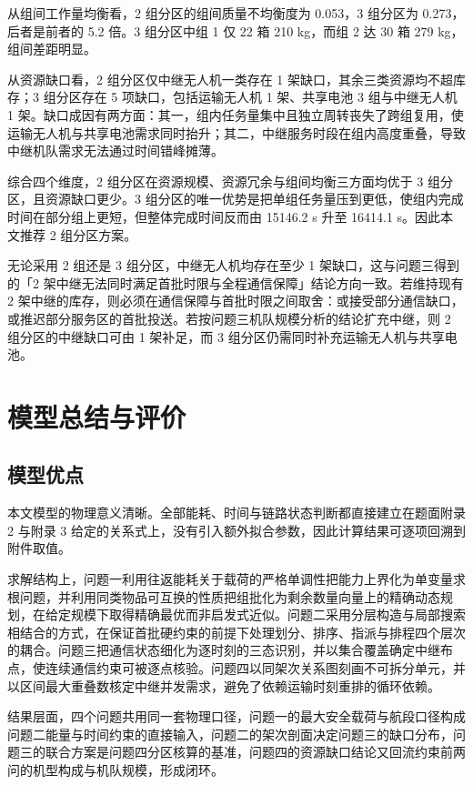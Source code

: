 \documentclass[bwprint]{gmcmthesis}
\begin{document}
从组间工作量均衡看，2 组分区的组间质量不均衡度为 0.053，3 组分区为 0.273，后者是前者的 5.2 倍。3 组分区中组 1 仅 22 箱 210 kg，而组 2 达 30 箱 279 kg，组间差距明显。

从资源缺口看，2 组分区仅中继无人机一类存在 1 架缺口，其余三类资源均不超库存；3 组分区存在 5 项缺口，包括运输无人机 1 架、共享电池 3 组与中继无人机 1 架。缺口成因有两方面：其一，组内任务量集中且独立周转丧失了跨组复用，使运输无人机与共享电池需求同时抬升；其二，中继服务时段在组内高度重叠，导致中继机队需求无法通过时间错峰摊薄。

综合四个维度，2 组分区在资源规模、资源冗余与组间均衡三方面均优于 3 组分区，且资源缺口更少。3 组分区的唯一优势是把单组任务量压到更低，使组内完成时间在部分组上更短，但整体完成时间反而由 15146.2 s 升至 16414.1 s。因此本文推荐 2 组分区方案。

无论采用 2 组还是 3 组分区，中继无人机均存在至少 1 架缺口，这与问题三得到的「2 架中继无法同时满足首批时限与全程通信保障」结论方向一致。若维持现有 2 架中继的库存，则必须在通信保障与首批时限之间取舍：或接受部分通信缺口，或推迟部分服务区的首批投送。若按问题三机队规模分析的结论扩充中继，则 2 组分区的中继缺口可由 1 架补足，而 3 组分区仍需同时补充运输无人机与共享电池。

\section{模型总结与评价}

\subsection{模型优点}
本文模型的物理意义清晰。全部能耗、时间与链路状态判断都直接建立在题面附录 2 与附录 3 给定的关系式上，没有引入额外拟合参数，因此计算结果可逐项回溯到附件取值。

求解结构上，问题一利用往返能耗关于载荷的严格单调性把能力上界化为单变量求根问题，并利用同类物品可互换的性质把组批化为剩余数量向量上的精确动态规划，在给定规模下取得精确最优而非启发式近似。问题二采用分层构造与局部搜索相结合的方式，在保证首批硬约束的前提下处理划分、排序、指派与排程四个层次的耦合。问题三把通信状态细化为逐时刻的三态识别，并以集合覆盖确定中继布点，使连续通信约束可被逐点核验。问题四以同架次关系图刻画不可拆分单元，并以区间最大重叠数核定中继并发需求，避免了依赖运输时刻重排的循环依赖。

结果层面，四个问题共用同一套物理口径，问题一的最大安全载荷与航段口径构成问题二能量与时间约束的直接输入，问题二的架次剖面决定问题三的缺口分布，问题三的联合方案是问题四分区核算的基准，问题四的资源缺口结论又回流约束前两问的机型构成与机队规模，形成闭环。
\end{document}
